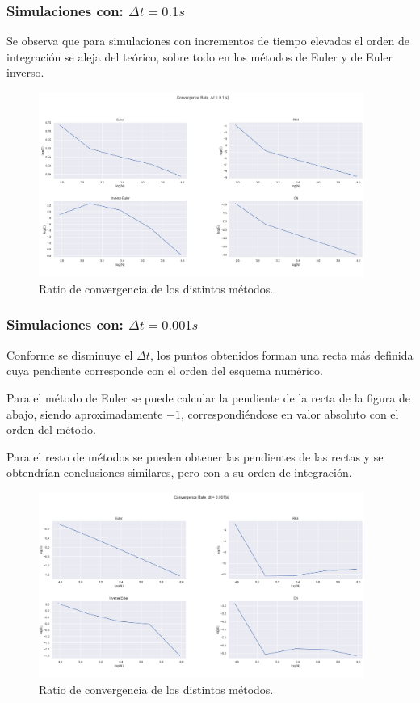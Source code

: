 \documentclass[12pt,a4paper]{article}
\begin{document}
\subsubsection{Simulaciones con: $\Delta t = 0.1 s$}
Se observa que para simulaciones con incrementos de tiempo elevados el orden de integración se aleja del teórico, sobre todo en los métodos de Euler y de Euler inverso. 
\begin{figure}[H] 
	\centering
	\includegraphics[width=0.95\textwidth]{FIGURES/dt0.1_convergence.png}
	\caption{Ratio de convergencia de los distintos métodos.}
\end{figure}


\subsubsection{Simulaciones con: $\Delta t = 0.001 s$}
Conforme se disminuye el $\Delta t$, los puntos obtenidos forman una recta más definida cuya pendiente corresponde con el orden del esquema numérico.

Para el método de Euler se puede calcular la pendiente de la recta de la figura de abajo, siendo aproximadamente $-1$, correspondiéndose en valor absoluto con el orden del método.

Para el resto de métodos se pueden obtener las pendientes de las rectas y se obtendrían conclusiones similares, pero con a su orden de integración.
\begin{figure}[H] 
	\centering
	\includegraphics[width=0.95\textwidth]{FIGURES/dt0.001_convergence.png}
	\caption{Ratio de convergencia de los distintos métodos.}
\end{figure}
\end{document}
